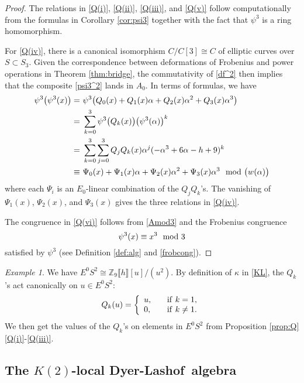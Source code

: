 \documentclass{gtpart}
\theoremstyle{definition}
\theoremstyle{remark}
\newtheorem{ex}[thm]{Example}
\newcommand{\mb}[1]{\mathbb{#1}}
\newcommand{\DL}{Dyer-Lashof~}
\newcommand{\BZ}{{\mb Z}}
\newcommand{\md}{~~{\rm mod}~}
\newcommand{\A}{\alpha}
\newcommand{\K}{\kappa}
\newcommand{\p}{\psi^3}
\newcommand{\q}[1]{Proposition \ref{prop:Q}\thinspace \eqref{Q(#1)}}
\numberwithin{equation}{section}
\numberwithin{thm}{section}
\begin{document}
\begin{proof}
 The relations in \eqref{Q(i)}, \eqref{Q(ii)}, \eqref{Q(iii)}, and 
 \eqref{Q(v)} follow computationally from the formulas in Corollary 
 \ref{cor:psi3} together with the fact that $\p$ is a ring homomorphism.  

 For \eqref{Q(iv)}, there is a canonical isomorphism $C/C[3] \cong C$ of 
 elliptic curves over $S \subset S_3$.  Given the correspondence between 
 deformations of Frobenius and power operations in Theorem 
 \ref{thm:bridge}, the commutativity of \eqref{df^2} then implies that 
 the composite \eqref{psi3^2} lands in $A_0$.  In terms of formulas, we 
 have 
 \begin{equation*}
 \begin{split}
  \p \big( \p(x) \big) = & ~ \p \big( Q_0(x) + Q_1(x) \A + Q_2(x) \A^2 + Q_3(x) \A^3 \big) \\
                       = & ~ \sum_{k = 0}^3 \p \big( Q_k(x) \big) \big( \p(\A) \big)^k \\
                       = & ~ \sum_{k = 0}^3 \sum_{j = 0}^3 Q_jQ_k(x) \A^j (-\A^3 + 6 \A - h + 9)^k \\
                  \equiv & ~ \Psi_0(x) + \Psi_1(x) \A + \Psi_2(x) \A^2 + \Psi_3(x) \A^3 \md \big( w(\A) \big) 
 \end{split}
 \end{equation*}
 where each $\Psi_i$ is an $E_0$-linear combination of the $Q_jQ_k$'s.  
 The vanishing of $\Psi_1(x)$, $\Psi_2(x)$, and $\Psi_3(x)$ gives the 
 three relations in \eqref{Q(iv)}.  

 The congruence in \eqref{Q(vi)} follows from \eqref{Amod3} and the 
 Frobenius congruence 
 \[
  \p(x) \equiv x^3 \md 3 
 \]
 satisfied by $\p$ (see Definition \ref{def:alg} and \eqref{frobcong}).  
\end{proof}

\begin{ex}
 We have $E^0 S^2 \cong \BZ_9 \llbracket h \rrbracket [u] / (u^2)$.  By 
 definition of $\K$ in \eqref{KL}, the $Q_k$'s act canonically on 
 $u \in E^0 S^2$: 
 \[
  Q_k(u) = \left\{
  \begin{array}{ll}
    u,  & \quad {\rm if}~k = 1, \\
    0,  & \quad {\rm if}~k \neq 1.  
  \end{array}
  \right.
 \]
 We then get the values of the $Q_k$'s on elements in $E^0 S^2$ from 
 \q{i}-\eqref{Q(iii)}.  
\end{ex}


\subsection{The $K(2)$-local \DL algebra}
\label{subsec:K(2)DL}
\end{document}

